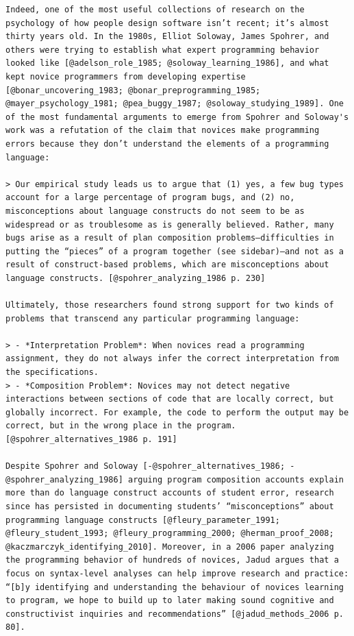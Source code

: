 \begin{verbatim}
Indeed, one of the most useful collections of research on the psychology of how people design software isn’t recent; it’s almost thirty years old. In the 1980s, Elliot Soloway, James Spohrer, and others were trying to establish what expert programming behavior looked like [@adelson_role_1985; @soloway_learning_1986], and what kept novice programmers from developing expertise [@bonar_uncovering_1983; @bonar_preprogramming_1985; @mayer_psychology_1981; @pea_buggy_1987; @soloway_studying_1989]. One of the most fundamental arguments to emerge from Spohrer and Soloway's work was a refutation of the claim that novices make programming errors because they don’t understand the elements of a programming language:

> Our empirical study leads us to argue that (1) yes, a few bug types account for a large percentage of program bugs, and (2) no, misconceptions about language constructs do not seem to be as widespread or as troublesome as is generally believed. Rather, many bugs arise as a result of plan composition problems—difficulties in putting the “pieces” of a program together (see sidebar)—and not as a result of construct-based problems, which are misconceptions about language constructs. [@spohrer_analyzing_1986 p. 230]

Ultimately, those researchers found strong support for two kinds of problems that transcend any particular programming language:

> - *Interpretation Problem*: When novices read a programming assignment, they do not always infer the correct interpretation from the specifications.
> - *Composition Problem*: Novices may not detect negative interactions between sections of code that are locally correct, but globally incorrect. For example, the code to perform the output may be correct, but in the wrong place in the program. [@spohrer_alternatives_1986 p. 191]

Despite Spohrer and Soloway [-@spohrer_alternatives_1986; -@spohrer_analyzing_1986] arguing program composition accounts explain more than do language construct accounts of student error, research since has persisted in documenting students’ “misconceptions” about programming language constructs [@fleury_parameter_1991; @fleury_student_1993; @fleury_programming_2000; @herman_proof_2008; @kaczmarczyk_identifying_2010]. Moreover, in a 2006 paper analyzing the programming behavior of hundreds of novices, Jadud argues that a focus on syntax-level analyses can help improve research and practice: “[b]y identifying and understanding the behaviour of novices learning to program, we hope to build up to later making sound cognitive and constructivist inquiries and recommendations” [@jadud_methods_2006 p. 80].


\end{verbatim}
